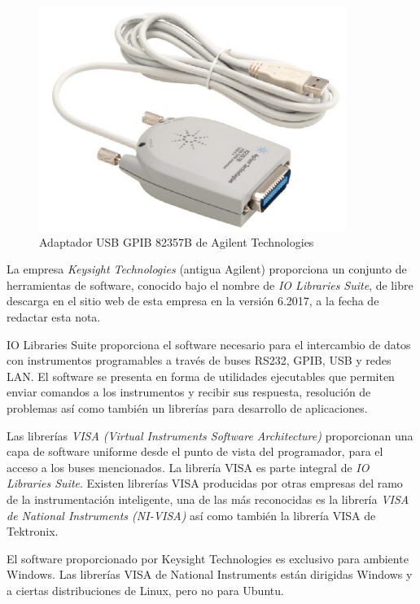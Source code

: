 \documentclass[paper=letter,oneside,fontsize=11pt, parskip=full]{scrartcl}
\begin{document}
		\begin{figure}[!h]
			\begin{center}
				\includegraphics[width=10cm]{Imagenes/AdaptadorGpibUsb.pdf}
				\caption{Adaptador USB GPIB 82357B de Agilent Technologies}
				\label{Fig:AdaptadorGpibUsb}
			\end{center}
		\end{figure}	
		
		La empresa \emph{Keysight Technologies} (antigua Agilent) proporciona un conjunto de herramientas de software, conocido bajo el nombre de \emph{IO Libraries Suite}, de libre descarga en el sitio web de esta empresa en la versión 6.2017, a la fecha de redactar esta nota.
		
		IO Libraries Suite proporciona el software necesario para el intercambio de datos con instrumentos programables a través de buses RS232, GPIB, USB y redes LAN. El software se presenta en forma de utilidades ejecutables que permiten enviar comandos a los instrumentos y recibir sus respuesta, resolución de problemas así como también un librerías para desarrollo de aplicaciones.
		
		Las librerías \emph{VISA (Virtual Instruments Software Architecture) } proporcionan una capa de software uniforme desde el punto de vista del programador, para el acceso a los buses mencionados. La librería VISA es parte integral de \emph{IO Libraries Suite}. Existen librerías VISA producidas por otras empresas del ramo de la instrumentación inteligente, una de las más reconocidas es la librería \emph{VISA de National Instruments (NI-VISA)} así como también la librería VISA de Tektronix.
		
		El software proporcionado por Keysight Technologies es exclusivo para ambiente Windows. Las librerías VISA de National Instruments están dirigidas Windows y a ciertas distribuciones de Linux, pero no para Ubuntu.
		
\end{document}

